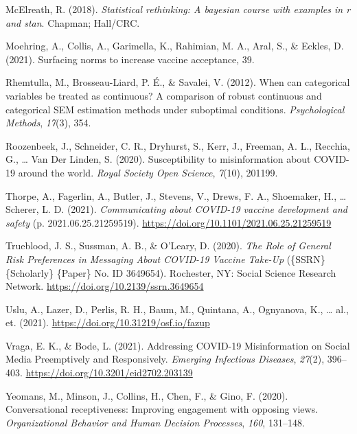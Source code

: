 \documentclass[
  english,
  ,jou,floatsintext]{apa6}
\newlength{\cslhangindent}
\newlength{\cslentryspacingunit} %
\newenvironment{CSLReferences}[2] %
 {%
  \setlength{\parindent}{0pt}
  \ifodd #1
  \let\oldpar\par
  \def\par{\hangindent=\cslhangindent\oldpar}
  \fi
  \setlength{\parskip}{#2\cslentryspacingunit}
 }%
 {}
\begin{document}
\begin{CSLReferences}{1}{0}
\leavevmode{}%
McElreath, R. (2018). \emph{Statistical rethinking: A bayesian course with examples in r and stan}. Chapman; Hall/CRC.

\leavevmode{}%
Moehring, A., Collis, A., Garimella, K., Rahimian, M. A., Aral, S., \& Eckles, D. (2021). Surfacing norms to increase vaccine acceptance, 39.

\leavevmode{}%
Rhemtulla, M., Brosseau-Liard, P. É., \& Savalei, V. (2012). When can categorical variables be treated as continuous? A comparison of robust continuous and categorical SEM estimation methods under suboptimal conditions. \emph{Psychological Methods}, \emph{17}(3), 354.

\leavevmode{}%
Roozenbeek, J., Schneider, C. R., Dryhurst, S., Kerr, J., Freeman, A. L., Recchia, G., \ldots{} Van Der Linden, S. (2020). Susceptibility to misinformation about COVID-19 around the world. \emph{Royal Society Open Science}, \emph{7}(10), 201199.

\leavevmode{}%
Thorpe, A., Fagerlin, A., Butler, J., Stevens, V., Drews, F. A., Shoemaker, H., \ldots{} Scherer, L. D. (2021). \emph{Communicating about {COVID}-19 vaccine development and safety} (p. 2021.06.25.21259519). \url{https://doi.org/10.1101/2021.06.25.21259519}

\leavevmode{}%
Trueblood, J. S., Sussman, A. B., \& O'Leary, D. (2020). \emph{The {Role} of {General} {Risk} {Preferences} in {Messaging} {About} {COVID}-19 {Vaccine} {Take}-{Up}} (\{SSRN\} \{Scholarly\} \{Paper\} No. ID 3649654). Rochester, NY: Social Science Research Network. \url{https://doi.org/10.2139/ssrn.3649654}

\leavevmode{}%
Uslu, A., Lazer, D., Perlis, R. H., Baum, M., Quintana, A., Ognyanova, K., \ldots{} al., et. (2021). \url{https://doi.org/10.31219/osf.io/fazup}

\leavevmode{}%
Vraga, E. K., \& Bode, L. (2021). Addressing {COVID}-19 {Misinformation} on {Social} {Media} {Preemptively} and {Responsively}. \emph{Emerging Infectious Diseases}, \emph{27}(2), 396--403. \url{https://doi.org/10.3201/eid2702.203139}

\leavevmode{}%
Yeomans, M., Minson, J., Collins, H., Chen, F., \& Gino, F. (2020). Conversational receptiveness: Improving engagement with opposing views. \emph{Organizational Behavior and Human Decision Processes}, \emph{160}, 131--148.

\end{CSLReferences}
\end{document}
